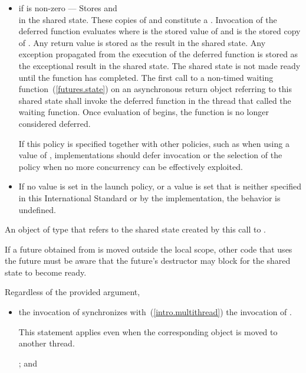 \begin{itemdescr}
\begin{itemize}
\item
if  is non-zero ---
Stores  and\\
in the shared state. These copies of  and  constitute
a . Invocation of the deferred function evaluates
 where  is the stored value of 
 and  is the stored copy of
.
Any return value is stored
as the result in the shared state.
Any exception propagated
from the execution
of the deferred function
is stored as the exceptional result
in the shared state.
The shared state is not
made ready until the function has completed. The first call to a
non-timed waiting function~(\ref{futures.state})
on an asynchronous return object referring to
this shared state shall invoke the
deferred function in the thread that called the waiting function.
Once evaluation of  begins, the function is no longer
considered deferred.
\begin{note} If this policy is specified together with other policies, such as when using a
 value of , implementations should defer
invocation or the selection of the policy when no more concurrency can be effectively
exploited. \end{note}

\item
If no value is set in the launch policy, or a value is set that is neither specified
in this International Standard or by the implementation, the behavior is undefined.
\end{itemize}

\pnum
\returns An object of type
 that refers
to the shared state created by this call to .
\begin{note} If a future obtained from  is moved outside the local scope,
other code that uses the future must be aware that the future's destructor may
block for the shared state to become ready. \end{note}

\pnum
\sync
Regardless of the provided  argument,
\begin{itemize}
\item
the invocation of 
synchronizes with~(\ref{intro.multithread}) the invocation of . \begin{note}
This statement applies even when the corresponding  object is moved to
another thread. \end{note}; and


\end{itemize}
\end{itemdescr}
